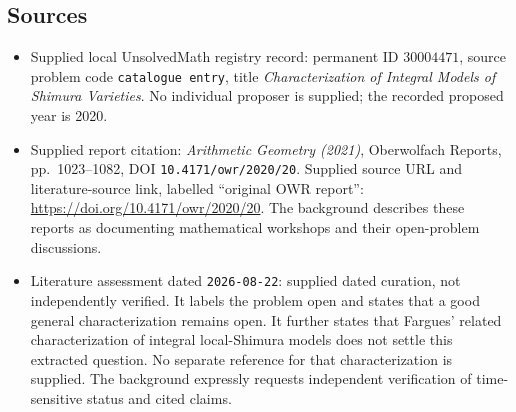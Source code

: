 \documentclass[11pt]{article}
\begin{document}
\subsection{Sources}
\begin{itemize}
\item Supplied local UnsolvedMath registry record: permanent ID \(30004471\), source problem code \texttt{catalogue entry}, title \emph{Characterization of Integral Models of Shimura Varieties}. No individual proposer is supplied; the recorded proposed year is 2020.
\item Supplied report citation: \emph{Arithmetic Geometry (2021)}, Oberwolfach Reports, pp.\ 1023--1082, DOI \texttt{10.4171/owr/2020/20}. Supplied source URL and literature-source link, labelled ``original OWR report'': \url{https://doi.org/10.4171/owr/2020/20}. The background describes these reports as documenting mathematical workshops and their open-problem discussions.
\item Literature assessment dated \texttt{2026-08-22}: supplied dated curation, not independently verified. It labels the problem open and states that a good general characterization remains open. It further states that Fargues' related characterization of integral local-Shimura models does not settle this extracted question. No separate reference for that characterization is supplied. The background expressly requests independent verification of time-sensitive status and cited claims.
\end{itemize}
\end{document}
